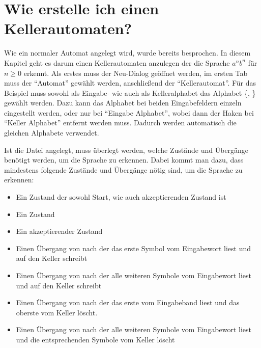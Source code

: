 \chapter{Wie erstelle ich einen Kellerautomaten?}\label{PDA}


Wie ein normaler Automat angelegt wird, wurde bereits besprochen. In diesem
Kapitel geht es darum einen Kellerautomaten anzulegen der die Sprache $a^n b^n$
für $n \geq 0$ erkennt. Als erstes muss der Neu-Dialog geöffnet werden, im ersten
Tab muss der "`Automat"' gewählt werden, anschließend der "`Kellerautomat"'. Für
das Beispiel muss sowohl als Eingabe- wie auch als Kelleralphabet das Alphabet
\{, \} gewählt werden. Dazu kann das Alphabet bei beiden
Eingabefeldern einzeln eingestellt werden, oder nur bei "`Eingabe Alphabet"',
wobei dann der Haken bei "`Keller Alphabet"' entfernt werden muss. Dadurch werden
automatisch die gleichen Alphabete verwendet.\vspace{10pt}

Ist die Datei angelegt, muss überlegt werden, welche Zustände und Übergänge
benötigt werden, um die Sprache zu erkennen. Dabei kommt man dazu, dass
mindestens folgende Zustände und Übergänge nötig sind, um die Sprache zu
erkennen:

\begin{itemize}
  \item Ein Zustand  der sowohl Start, wie auch akzeptierenden
  Zustand ist
  \item Ein Zustand 
  \item Ein akzeptierender Zustand 
  \item Einen Übergang von  nach  der das erste Symbol
   vom Eingabewort liest und auf den Keller schreibt
  \item Einen Übergang von  nach  der alle weiteren Symbole
   vom Eingabewort liest und auf den Keller schreibt
  \item Einen Übergang von  nach  der das erste 
  vom Eingabeband liest und das oberste  vom Keller löscht.
  \item Einen Übergang von  nach  der alle weiteren
  Symbole  vom Eingabewort liest und die entsprechenden Symbole
   vom Keller löscht
\end{itemize}

